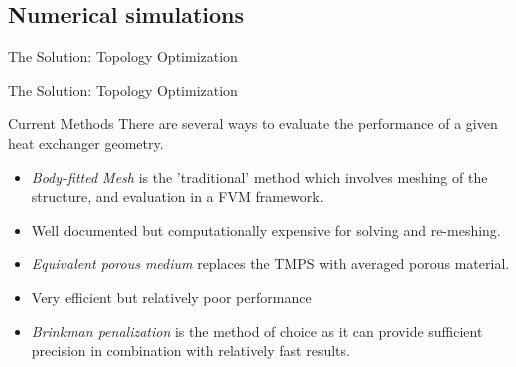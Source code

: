 \documentclass{beamer}
\begin{document}
	\subsection{Numerical simulations}
	\begin{frame}{The Solution: Topology Optimization}
		\centering
	\end{frame}
		\begin{frame}{The Solution: Topology Optimization}
		\centering
	\end{frame}
	\begin{frame}{Current Methods}
		There are several ways to evaluate the performance of a given heat exchanger geometry. 
		\begin{itemize}
			\item \emph{Body-fitted Mesh} is the 'traditional' method which involves meshing of the structure, and evaluation in a FVM framework. 
			\item[-] Well documented but computationally expensive for solving and re-meshing. 
			\item \emph{Equivalent porous medium} replaces the TMPS with averaged porous material. 
			\item[-] Very efficient but relatively poor performance \cite{art:porous}
			\item \emph{Brinkman penalization} is the method of choice as it can provide sufficient precision in combination with relatively fast results. 
		\end{itemize}
	\end{frame}
\end{document}
